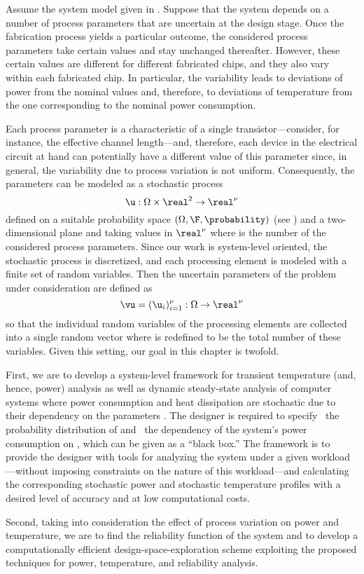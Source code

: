 Assume the system model given in . Suppose that the system
depends on a number of process parameters that are uncertain at the design
stage. Once the fabrication process yields a particular outcome, the considered
process parameters take certain values and stay unchanged thereafter. However,
these certain values are different for different fabricated chips, and they also
vary within each fabricated chip. In particular, the variability leads to
deviations of power from the nominal values and, therefore, to deviations of
temperature from the one corresponding to the nominal power consumption.

Each process parameter is a characteristic of a single transistor---consider,
for instance, the effective channel length---and, therefore, each device in the
electrical circuit at hand can potentially have a different value of this
parameter since, in general, the variability due to process variation is not
uniform. Consequently, the parameters can be modeled as a stochastic process
\[
  \u: \Omega \times \real^2 \to \real^\nu
\]
defined on a suitable probability space $(\Omega, \F, \probability)$ (see
) and a two-dimensional plane and taking values in
$\real^\nu$ where \nu is the number of the considered process parameters. Since
our work is system-level oriented, the stochastic process is discretized, and
each processing element is modeled with a finite set of random variables. Then
the uncertain parameters of the problem under consideration are defined as
\[
  \vu = (\u_i)_{i = 1}^\nu: \Omega \to \real^\nu
\]
so that the individual random variables of the processing elements are collected
into a single random vector where \nu is redefined to be the total number of
these variables. Given this setting, our goal in this chapter is twofold.

First, we are to develop a system-level framework for transient temperature
(and, hence, power) analysis as well as dynamic steady-state analysis of
computer systems where power consumption and heat dissipation are stochastic due
to their dependency on the parameters \vu. The designer is required to specify
\one~the probability distribution of \vu and \two~the dependency of the system's
power consumption on \vu, which can be given as a ``black box.'' The framework
is to provide the designer with tools for analyzing the system under a given
workload---without imposing constraints on the nature of this workload---and
calculating the corresponding stochastic power \mp and stochastic temperature
\mq profiles with a desired level of accuracy and at low computational costs.

Second, taking into consideration the effect of process variation on power and
temperature, we are to find the reliability function of the system and to
develop a computationally efficient design-space-exploration scheme exploiting
the proposed techniques for power, temperature, and reliability analysis.
